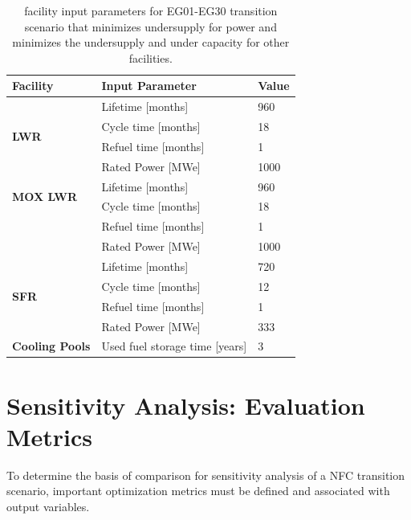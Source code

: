 \begin{table}[H]
    \centering
    \caption{\Cyclus facility input parameters for
	EG01-EG30 transition scenario
	that minimizes undersupply for power and minimizes 
	the undersupply and under capacity for other facilities. }
	\label{tab:facinputs}
    \scriptsize
    \begin{tabular}{lll}
        \hline
        \textbf{Facility}                 & \textbf{Input Parameter}                    & \textbf{Value} \\ \hline
        \multirow{4}{*}{\textbf{LWR}}     & Lifetime {[}months{]}              & 960   \\
                                 & Cycle time {[}months{]}            & 18    \\
                                 & Refuel time {[}months{]}           & 1     \\
                                 & Rated Power {[}MWe{]}              & 1000  \\ \hline
        \multirow{2}{*}{\textbf{MOX LWR}} & Lifetime {[}months{]}              & 960   \\
                                 & Cycle time {[}months{]}            & 18    \\
                                 & Refuel time {[}months{]}           & 1     \\
                                 & Rated Power {[}MWe{]}              & 1000  \\ \hline
        \multirow{4}{*}{\textbf{SFR}}     & Lifetime {[}months{]}              & 720   \\
                                 & Cycle time {[}months{]}            & 12    \\
                                 & Refuel time {[}months{]}           & 1     \\
                                 & Rated Power {[}MWe{]}              & 333   \\ \hline
        \textbf{Cooling Pools}            & Used fuel storage time {[}years{]} & 3  \\ \hline
        \end{tabular}
    \end{table}

\section{Sensitivity Analysis: Evaluation Metrics}
To determine the basis of comparison for sensitivity analysis 
of a \gls{NFC} transition scenario, important optimization 
metrics must be defined and associated with output variables.


